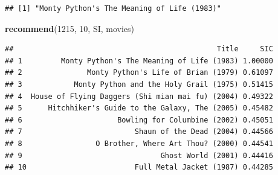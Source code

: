 \documentclass[10pt,b5paper,krantz1]{krantz}
\newenvironment{Shaded}{\begin{snugshade}}{\end{snugshade}}
\newcommand{\CommentTok}[1]{\textcolor[rgb]{0.37,0.37,0.37}{\textit{#1}}}
\newcommand{\ControlFlowTok}[1]{\textcolor[rgb]{0.27,0.27,0.27}{\textbf{#1}}}
\newcommand{\DataTypeTok}[1]{\textcolor[rgb]{0.27,0.27,0.27}{#1}}
\newcommand{\DecValTok}[1]{\textcolor[rgb]{0.06,0.06,0.06}{#1}}
\newcommand{\KeywordTok}[1]{\textcolor[rgb]{0.27,0.27,0.27}{\textbf{#1}}}
\newcommand{\NormalTok}[1]{#1}
\newcommand{\OperatorTok}[1]{\textcolor[rgb]{0.43,0.43,0.43}{\textbf{#1}}}
\newcommand{\OtherTok}[1]{\textcolor[rgb]{0.37,0.37,0.37}{#1}}
\newcommand{\StringTok}[1]{\textcolor[rgb]{0.5,0.5,0.5}{#1}}
\begin{document}
\begin{Shaded}
\end{Shaded}

\begin{Shaded}
\end{Shaded}

\begin{verbatim}
## [1] "Monty Python's The Meaning of Life (1983)"
\end{verbatim}

\begin{Shaded}
\begin{Highlighting}[]
\KeywordTok{recommend}\NormalTok{(}\DecValTok{1215}\NormalTok{, }\DecValTok{10}\NormalTok{, SI, movies)}
\end{Highlighting}
\end{Shaded}

\begin{verbatim}
##                                               Title     SIC
## 1         Monty Python's The Meaning of Life (1983) 1.00000
## 2               Monty Python's Life of Brian (1979) 0.61097
## 3            Monty Python and the Holy Grail (1975) 0.51415
## 4  House of Flying Daggers (Shi mian mai fu) (2004) 0.49322
## 5      Hitchhiker's Guide to the Galaxy, The (2005) 0.45482
## 6                      Bowling for Columbine (2002) 0.45051
## 7                          Shaun of the Dead (2004) 0.44566
## 8                 O Brother, Where Art Thou? (2000) 0.44541
## 9                                Ghost World (2001) 0.44416
## 10                         Full Metal Jacket (1987) 0.44285
\end{verbatim}
\end{document}
